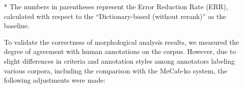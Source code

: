 \documentclass[AMS,STIX2COL]{WileyNJD-v2}
\begin{document}
\begin{table}[ht]
\begin{tabular*}{500pt}{@{\extracolsep\fill}c|cccccc@{\extracolsep\fill}}
            \bottomrule
        \end{tabular*}
        \begin{tablenotes}
            \footnotesize
            \item\hspace{2mm} * The numbers in parentheses represent the Error Reduction Rate (ERR), calculated with respect to the ``Dictionary-based (without rerank)'' as the baseline.
        \end{tablenotes}
    \end{table}

    To validate the correctness of morphological analysis results, we measured the degree of agreement with human annotations on the corpus.
    However, due to slight differences in criteria and annotation styles among annotators labeling various corpora, including the comparison with the MeCab-ko system, the following adjustments were made:
\end{document}
